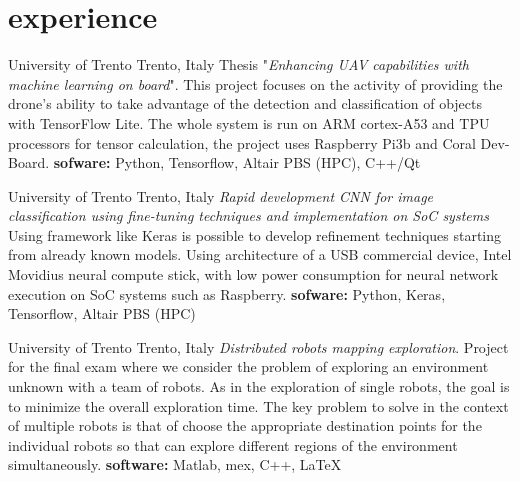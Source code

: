 \documentclass[a4,oneside]{friggeri-cv} %
\begin{document}
\section{experience}
  \begin{entrylist}
    {University of Trento}
    {Trento, Italy}
    {Thesis "\emph{Enhancing UAV capabilities with machine learning on board}".}
    {This project focuses on the activity of providing the drone's ability to take advantage of the detection and classification of objects with TensorFlow Lite.
The whole system is run on ARM cortex-A53 and TPU processors for
tensor calculation, the project uses Raspberry Pi3b and Coral Dev-Board.}
    {\textbf{sofware:} Python, Tensorflow, Altair PBS (HPC), C++/Qt} 
    {\href{https://github.com/frank1789/MasterThesis}{\faGithub}}
    

    {University of Trento}
    {Trento, Italy}
    {\emph{Rapid development CNN for image classification using fine-tuning techniques and
     implementation on SoC systems}}
    {Using framework like Keras is possible to develop refinement techniques starting
    from already known models. Using architecture of a USB commercial device,
    Intel Movidius neural compute stick, with low power consumption for neural network execution
    on SoC systems such as Raspberry.}
    {\textbf{sofware:} Python, Keras, Tensorflow, Altair PBS (HPC)}
    {\href{https://github.com/frank1789/NeuralNetworks}{\faGithub}}
      

    {University of Trento}
    {Trento, Italy}
    {\emph{Distributed robots mapping exploration}.}
    {Project for the final exam where we consider the problem of exploring
    an environment unknown with a team of robots. As in the exploration of
    single robots, the goal is to minimize the overall exploration time.
    The key problem to solve in the context of multiple robots is that of choose
    the appropriate destination points for the individual robots so that can explore
    different regions of the environment simultaneously.}
    {\textbf{software: } Matlab, mex, C++, \LaTeX}
    {\href{https://github.com/frank1789/DistributedSystemProject}{\faGithub}}
      
\end{entrylist}
\end{document}
